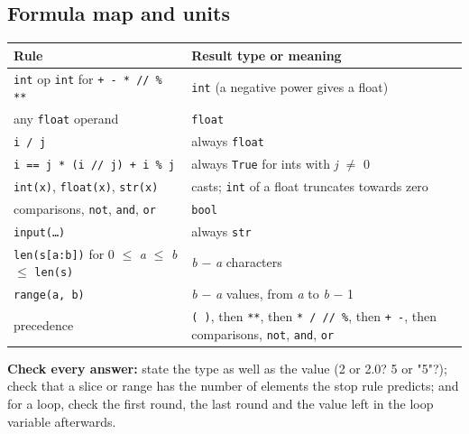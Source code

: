 \documentclass[11pt]{article}
\begin{document}
\begin{keepsection}
\section{Formula map and units}

\begin{center}\small\begin{tabularx}{\linewidth}{>{\raggedright\arraybackslash}X>{\raggedright\arraybackslash}X}\toprule
\textbf{Rule} & \textbf{Result type or meaning} \\ \midrule
\texttt{int} op \texttt{int} for \texttt{+ - * // \% **} & \texttt{int} (a negative power gives a float) \\
any \texttt{float} operand & \texttt{float} \\
\texttt{i / j} & always \texttt{float} \\
\texttt{i == j * (i // j) + i \% j} & always \texttt{True} for ints with \textit{j} \ensuremath{\neq} 0 \\
\texttt{int(x)}, \texttt{float(x)}, \texttt{str(x)} & casts; \texttt{int} of a float truncates towards zero \\
comparisons, \texttt{not}, \texttt{and}, \texttt{or} & \texttt{bool} \\
\texttt{input(…)} & always \texttt{str} \\
\texttt{len(s[a:b])} for 0 \ensuremath{\leq} \textit{a} \ensuremath{\leq} \textit{b} \ensuremath{\leq} \texttt{len(s)} & \textit{b} \ensuremath{-} \textit{a} characters \\
\texttt{range(a, b)} & \textit{b} \ensuremath{-} \textit{a} values, from \textit{a} to \textit{b} \ensuremath{-} 1 \\
precedence & \texttt{( )}, then \texttt{**}, then \texttt{* / // \%}, then \texttt{+ -}, then comparisons, \texttt{not}, \texttt{and}, \texttt{or} \\
\bottomrule\end{tabularx}\end{center}

\begin{notebox}\textbf{Check every answer:} state the type as well as the value (2 or 2.0? 5 or "5"?); check that a slice or range has the number of elements the stop rule predicts; and for a loop, check the first round, the last round and the value left in the loop variable afterwards.\end{notebox}
\end{keepsection}
\end{document}
